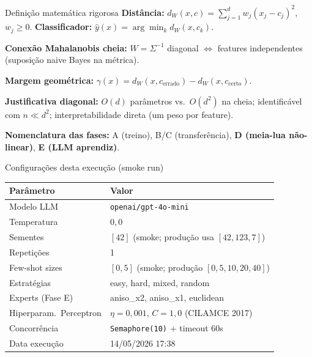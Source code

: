 \documentclass[aspectratio=169,10pt]{beamer}
\begin{document}
\begin{frame}{Defini\c{c}\~ao matem\'atica rigorosa}
  \scriptsize
  \textbf{Dist\^ancia:} $d_W(x, c) = \sum_{j=1}^{d} w_j (x_j - c_j)^2$, $w_j \geq 0$.
  \textbf{Classificador:} $\hat y(x) = \arg\min_k d_W(x, c_k)$.
  \medskip

  \textbf{Conex\~ao Mahalanobis cheia:} $W = \Sigma^{-1}$ diagonal $\Leftrightarrow$ features independentes (suposi\c{c}\~ao naive Bayes na m\'etrica).
  \medskip

  \textbf{Margem geom\'etrica:} $\gamma(x) = d_W(x, c_{\text{errado}}) - d_W(x, c_{\text{certo}})$.
  \medskip

  \textbf{Justificativa diagonal:} $O(d)$ par\^ametros vs.\ $O(d^2)$ na cheia; identific\'avel com $n \ll d^2$; interpretabilidade direta (um peso por feature).
  \medskip

  \textbf{Nomenclatura das fases:} A (treino), B/C (transfer\^encia), \textbf{D (meia-lua n\~ao-linear)}, \textbf{E (LLM aprendiz)}.
\end{frame}

\begin{frame}{Configura\c{c}\~oes desta execu\c{c}\~ao (smoke run)}
  \footnotesize
  \begin{center}
  \begin{tabular}{ll}
    \toprule
    \textbf{Par\^ametro} & \textbf{Valor} \\
    \midrule
    Modelo LLM & \texttt{openai/gpt-4o-mini} \\
    Temperatura & $0{,}0$ \\
    Sementes & $[42]$ (smoke; produ\c{c}\~ao usa $[42, 123, 7]$) \\
    Repeti\c{c}\~oes & 1 \\
    Few-shot sizes & $[0, 5]$ (smoke; produ\c{c}\~ao $[0, 5, 10, 20, 40]$) \\
    Estrat\'egias & easy, hard, mixed, random \\
    Experts (Fase E) & aniso\_x2, aniso\_x1, euclidean \\
    Hiperparam.\ Perceptron & $\eta=0{,}001$, $C=1{,}0$ (CILAMCE 2017) \\
    Concorr\^encia & \texttt{Semaphore(10)} + timeout 60s \\
    Data execu\c{c}\~ao & 14/05/2026 17:38 \\
    \bottomrule
  \end{tabular}
  \end{center}
\end{frame}
\end{document}
